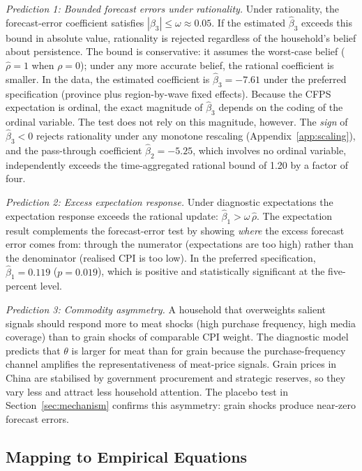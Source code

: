 \textit{Prediction 1: Bounded forecast errors under rationality.}
Under rationality, the forecast-error coefficient satisfies
$|\beta_3| \leq \omega \approx 0.05$.
If the estimated $\hat{\beta}_3$ exceeds this bound in
absolute value, rationality is rejected regardless of the
household's belief about persistence.
The bound is conservative: it assumes the worst-case belief
($\hat{\rho} = 1$ when $\rho = 0$); under any more accurate
belief, the rational coefficient is smaller.
In the data, the estimated coefficient is $\hat{\beta}_3 =
-7.61$ under the preferred specification (province plus
region-by-wave fixed effects).
Because the CFPS expectation is ordinal, the exact magnitude
of $\hat{\beta}_3$ depends on the coding of the ordinal
variable.
The test does not rely on this magnitude, however.
The \textit{sign} of $\hat{\beta}_3 < 0$ rejects rationality
under any monotone rescaling
(Appendix~\ref{app:scaling}), and the pass-through
coefficient $\hat{\beta}_2 = -5.25$, which involves no
ordinal variable, independently exceeds the time-aggregated
rational bound of 1.20 by a factor of four.

\textit{Prediction 2: Excess expectation response.}
Under diagnostic expectations the expectation response
exceeds the rational update:
$\hat{\beta}_1 > \omega\,\hat{\rho}$.
The expectation result complements the forecast-error test
by showing \textit{where} the excess forecast error comes
from: through the numerator (expectations are too high) rather
than the denominator (realised CPI is too low).
In the preferred specification, $\hat{\beta}_1 = 0.119$
($p = 0.019$), which is positive and statistically significant
at the five-percent level.

\textit{Prediction 3: Commodity asymmetry.}
A household that overweights salient signals should respond more
to meat shocks (high purchase frequency, high media coverage)
than to grain shocks of comparable CPI weight.
The diagnostic model predicts that $\theta$ is larger for
meat than for grain because the purchase-frequency channel
amplifies the representativeness of meat-price signals.
Grain prices in China are stabilised by government procurement
and strategic reserves, so they vary less and attract less
household attention.
The placebo test in Section~\ref{sec:mechanism} confirms this
asymmetry: grain shocks produce near-zero forecast errors.

\subsection{Mapping to Empirical Equations}\label{sec:model_mapping}

